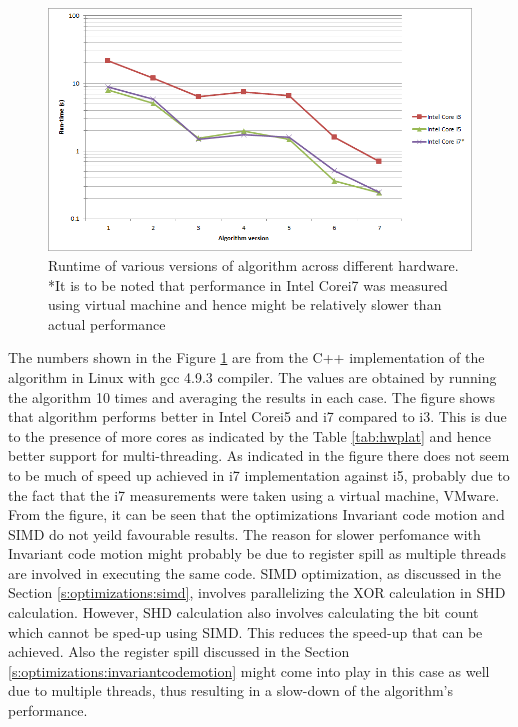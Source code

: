 \begin{figure}[!htbp]
    \center
    \captionsetup{justification=centering}
    \includegraphics[width=\linewidth]{figures/Runtime}
    \caption{Runtime of various versions of algorithm across different hardware.\\ *It is to be noted that performance in Intel Corei7 was measured using virtual machine and hence might be relatively slower than actual performance}
    \label{fig:algort}
\end{figure}

The numbers shown in the Figure \ref{fig:algort} are from the C++ implementation of the algorithm in Linux with gcc 4.9.3 compiler. The values are obtained by running the algorithm 10 times and averaging the results in each case. The figure shows that algorithm performs better in Intel Corei5 and i7 compared to i3. This is due to the presence of more cores as indicated by the Table \ref{tab:hwplat} and hence better support for multi-threading. As indicated in the figure there does not seem to be much of speed up achieved in i7 implementation against i5, probably due to the fact that the i7 measurements were taken using a virtual machine, VMware.\\

From the figure, it can be seen that the optimizations Invariant code motion and  SIMD do not yeild favourable results. The reason for slower perfomance with Invariant code motion might probably be due to register spill as multiple threads are involved in executing the same code. SIMD optimization, as discussed in the Section \ref{s:optimizations:simd}, involves parallelizing the XOR calculation in SHD calculation. However, SHD calculation also involves calculating the bit count which cannot be sped-up using SIMD. This reduces the speed-up that can be achieved. Also the register spill discussed in the Section \ref{s:optimizations:invariantcodemotion} might come into play in this case as well due to multiple threads, thus resulting in a slow-down of the algorithm's performance.\\

